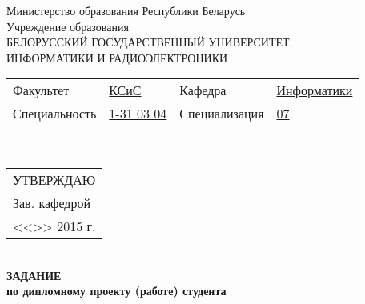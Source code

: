 {
  \thispagestyle{empty}
  \setlength{\parindent}{0em}

  \newcommand{\lineunderscore}{\uline{\hspace*{\fill}}}
  \newcommand{\underlined}[1]{\uline{ #1\hfill}}
  \newcommand{\underlinedbox}[2]{\makebox[#1]{\uline{ #2\hfill}}}
  \newcommand{\underlinedcentered}[1]{\centering\uline{\makebox[\linewidth]{#1}}}

  \begin{center}
    Министерство образования Республики Беларусь\\
    Учреждение образования\\
    БЕЛОРУССКИЙ ГОСУДАРСТВЕННЫЙ УНИВЕРСИТЕТ \\
    ИНФОРМАТИКИ И РАДИОЭЛЕКТРОНИКИ\\[1em]


  \begin{minipage}{\textwidth}
    \begin{flushleft}
      \begin{tabular}{ p{}p{}p{}p{} @{} }
        Факультет & \underlined{КСиС} & Кафедра & \underlined{Информатики} \\
        Специальность & \underlined{1-31 03 04} & Специализация & \underlined{07}
      \end{tabular}
    \end{flushleft}
  \end{minipage}\\[1em]

  \begin{minipage}{\textwidth}
    \begin{flushright}
      \begin{tabular}{p{}}
        \hspace{6.8em} УТВЕРЖДАЮ \\
        \underline{\hspace*{7em}} Зав. кафедрой \\
        <<\underline{\hspace*{4ex}}>> \underline{\hspace*{7em}} 2015 г.
      \end{tabular}
    \end{flushright}
  \end{minipage}\\[1em]

  \textbf{ЗАДАНИЕ} \\
  \textbf{по дипломному проекту (работе) студента}


\end{center}}
